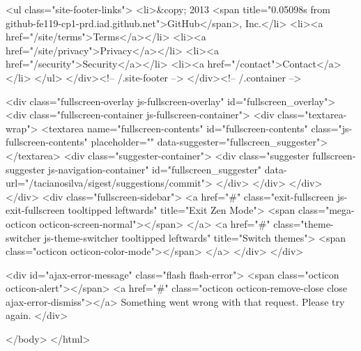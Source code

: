     <ul class="site-footer-links">
      <li>&copy; 2013 <span title="0.05098s from github-fe119-cp1-prd.iad.github.net">GitHub</span>, Inc.</li>
        <li><a href="/site/terms">Terms</a></li>
        <li><a href="/site/privacy">Privacy</a></li>
        <li><a href="/security">Security</a></li>
        <li><a href="/contact">Contact</a></li>
    </ul>
  </div><!-- /.site-footer -->
</div><!-- /.container -->


    <div class="fullscreen-overlay js-fullscreen-overlay" id="fullscreen_overlay">
  <div class="fullscreen-container js-fullscreen-container">
    <div class="textarea-wrap">
      <textarea name="fullscreen-contents" id="fullscreen-contents" class="js-fullscreen-contents" placeholder="" data-suggester="fullscreen_suggester"></textarea>
          <div class="suggester-container">
              <div class="suggester fullscreen-suggester js-navigation-container" id="fullscreen_suggester"
                 data-url="/tacianosilva/sigest/suggestions/commit">
              </div>
          </div>
    </div>
  </div>
  <div class="fullscreen-sidebar">
    <a href="#" class="exit-fullscreen js-exit-fullscreen tooltipped leftwards" title="Exit Zen Mode">
      <span class="mega-octicon octicon-screen-normal"></span>
    </a>
    <a href="#" class="theme-switcher js-theme-switcher tooltipped leftwards"
      title="Switch themes">
      <span class="octicon octicon-color-mode"></span>
    </a>
  </div>
</div>



    <div id="ajax-error-message" class="flash flash-error">
      <span class="octicon octicon-alert"></span>
      <a href="#" class="octicon octicon-remove-close close ajax-error-dismiss"></a>
      Something went wrong with that request. Please try again.
    </div>

  </body>
</html>

